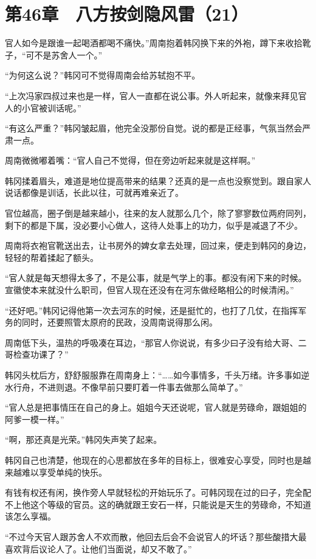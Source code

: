 \section{第46章　八方按剑隐风雷（21）}

官人如今是跟谁一起喝酒都喝不痛快。”周南抱着韩冈换下来的外袍，蹲下来收拾靴子，“可不是苏舍人一个。”

“为何这么说？”韩冈可不觉得周南会给苏轼抱不平。

“上次冯家四叔过来也是一样，官人一直都在说公事。外人听起来，就像来拜见官人的小官被训话呢。”

“有这么严重？”韩冈皱起眉，他完全没那份自觉。说的都是正经事，气氛当然会严肃一点。

周南微微嘟着嘴：“官人自己不觉得，但在旁边听起来就是这样啊。”

韩冈揉着眉头，难道是地位提高带来的结果？还真的是一点也没察觉到。跟自家人说话都像是训话，长此以往，可就再难亲近了。

官位越高，圈子倒是越来越小，往来的友人就那么几个，除了寥寥数位两府同列，剩下的都是下属，没必要小心做人，这待人处事上的功力，似乎是减退了不少。

周南将衣袍官靴送出去，让书房外的婢女拿去处理，回过来，便走到韩冈的身边，轻轻的帮着揉起了额头。

“官人就是每天想得太多了，不是公事，就是气学上的事。都没有闲下来的时候。宣徽使本来就没什么职司，但官人现在还没有在河东做经略相公的时候清闲。”

“还好吧。”韩冈记得他第一次去河东的时候，还是挺忙的，也打了几仗，在指挥军务的同时，还要照管太原府的民政，没周南说得那么闲。

周南低下头，温热的呼吸凑在耳边，“那官人你说说，有多少曰子没有给大哥、二哥检查功课了？”

韩冈头枕后方，舒舒服服靠在周南身上：“……如今事情多，千头万绪。许多事如逆水行舟，不进则退。不像早前只要盯着一件事去做那么简单了。”

“官人总是把事情压在自己的身上。姐姐今天还说呢，官人就是劳碌命，跟姐姐的阿爹一模一样。”

“啊，那还真是光荣。”韩冈失声笑了起来。

韩冈自己也清楚，他现在的心思都放在多年的目标上，很难安心享受，同时也是越来越难以享受单纯的快乐。

有钱有权还有闲，换作旁人早就轻松的开始玩乐了。可韩冈现在过的曰子，完全配不上他这个等级的官员。这的确就跟王安石一样，只能说是天生的劳碌命，不知道该怎么享福。

“不过今天官人跟苏舍人不欢而散，他回去后会不会说官人的坏话？那些酸措大最喜欢背后议论人了。让他们当面说，却又不敢了。”


